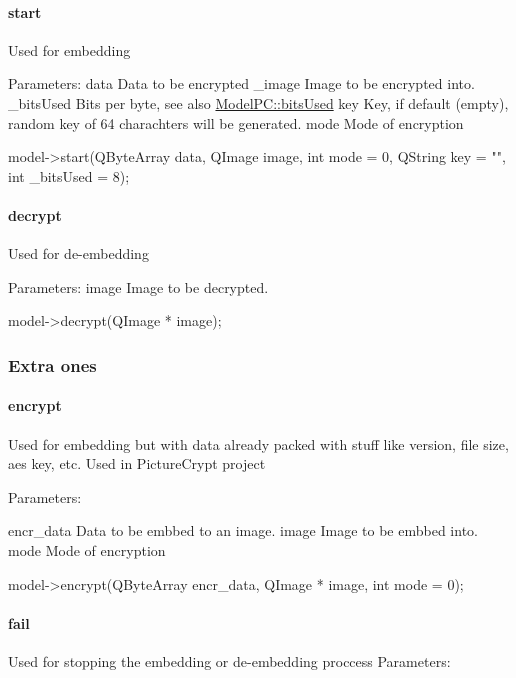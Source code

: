 \paragraph*{start}

Used for embedding

Parameters\+: data Data to be encrypted \+\_\+image Image to be encrypted into. \+\_\+bits\+Used Bits per byte, see also \mbox{\hyperlink{class_model_p_c_a655deb6a8afa94c7f4aadb3056989038}{Model\+P\+C\+::bits\+Used}} key Key, if default (empty), random key of 64 charachters will be generated. mode Mode of encryption 
\begin{DoxyCode}
model->start(QByteArray data, QImage image, int mode = 0, QString key = "", int \_bitsUsed = 8);
\end{DoxyCode}


\paragraph*{decrypt}

Used for de-\/embedding

Parameters\+: image Image to be decrypted.


\begin{DoxyCode}
model->decrypt(QImage * image);
\end{DoxyCode}
 \subsubsection*{Extra ones}

\paragraph*{encrypt}

Used for embedding but with data already packed with stuff like version, file size, aes key, etc. Used in Picture\+Crypt project

Parameters\+:

encr\+\_\+data Data to be embbed to an image. image Image to be embbed into. mode Mode of encryption


\begin{DoxyCode}
model->encrypt(QByteArray encr\_data, QImage * image, int mode = 0);
\end{DoxyCode}
 \paragraph*{fail}

Used for stopping the embedding or de-\/embedding proccess Parameters\+:


